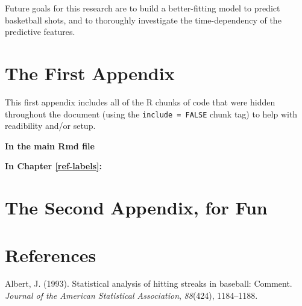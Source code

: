 \documentclass[12pt,twoside]{dukestatscithesis}
\theoremstyle{definition}
\theoremstyle{definition}
\theoremstyle{definition}
\theoremstyle{remark}
\begin{document}
Future goals for this research are to build a better-fitting model to
predict basketball shots, and to thoroughly investigate the
time-dependency of the predictive features.

\appendix

\chapter{The First Appendix}\label{the-first-appendix}

This first appendix includes all of the R chunks of code that were
hidden throughout the document (using the \texttt{include\ =\ FALSE}
chunk tag) to help with readibility and/or setup.

\textbf{In the main Rmd file}
\begin{Shaded}
\begin{Highlighting}[]
  \NormalTok{(}\NormalTok{, } \NormalTok{)}
  \NormalTok{(}\NormalTok{)}
\end{Highlighting}
\end{Shaded}
\textbf{In Chapter \ref{ref-labels}:}

\chapter{The Second Appendix, for
Fun}\label{the-second-appendix-for-fun}

\backmatter

\chapter*{References}\label{references}


\noindent

\setlength{\parindent}{-0.20in} \setlength{\leftskip}{0.20in}
\setlength{\parskip}{8pt}

\hypertarget{refs}{}
\hypertarget{ref-albert93}{}
Albert, J. (1993). Statistical analysis of hitting streaks in baseball:
Comment. \emph{Journal of the American Statistical Association},
\emph{88}(424), 1184--1188.
\end{document}
